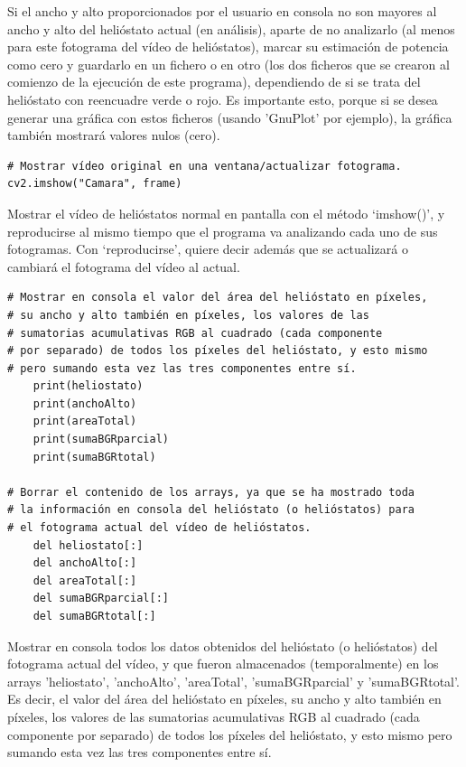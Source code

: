 Si el ancho y alto proporcionados por el usuario en consola no son mayores al ancho y alto del helióstato actual (en análisis), aparte de no analizarlo (al menos para este fotograma del vídeo de helióstatos), marcar su estimación de potencia como cero y guardarlo en un fichero o en otro (los dos ficheros que se crearon al comienzo de la ejecución de este programa), dependiendo de si se trata del helióstato con reencuadre verde o rojo. Es importante esto, porque si se desea generar una gráfica con estos ficheros (usando 'GnuPlot' por ejemplo), la gráfica también mostrará valores nulos (cero).\\[20pt]

\begin{lstlisting}
# Mostrar vídeo original en una ventana/actualizar fotograma.
cv2.imshow("Camara", frame)
\end{lstlisting}

Mostrar el vídeo de helióstatos normal en pantalla con el método ‘imshow()’, y reproducirse al mismo tiempo que el programa va analizando cada uno de sus fotogramas. Con ‘reproducirse’, quiere decir además que se actualizará o cambiará el fotograma del vídeo al actual.\\[20pt]

\begin{lstlisting}
# Mostrar en consola el valor del área del helióstato en píxeles,
# su ancho y alto también en píxeles, los valores de las
# sumatorias acumulativas RGB al cuadrado (cada componente
# por separado) de todos los píxeles del helióstato, y esto mismo
# pero sumando esta vez las tres componentes entre sí.
    print(heliostato)
    print(anchoAlto)
    print(areaTotal)
    print(sumaBGRparcial)
    print(sumaBGRtotal)

# Borrar el contenido de los arrays, ya que se ha mostrado toda
# la información en consola del helióstato (o helióstatos) para
# el fotograma actual del vídeo de helióstatos.
    del heliostato[:]
    del anchoAlto[:]
    del areaTotal[:]
    del sumaBGRparcial[:]
    del sumaBGRtotal[:]
\end{lstlisting}
    
Mostrar en consola todos los datos obtenidos del helióstato (o helióstatos) del fotograma actual del vídeo, y que fueron almacenados (temporalmente) en los arrays 'heliostato', 'anchoAlto', 'areaTotal', 'sumaBGRparcial' y 'sumaBGRtotal'. Es decir, el valor del área del helióstato en píxeles, su ancho y alto también en píxeles, los valores de las sumatorias acumulativas RGB al cuadrado (cada componente por separado) de todos los píxeles del helióstato, y esto mismo pero sumando esta vez las tres componentes entre sí.

